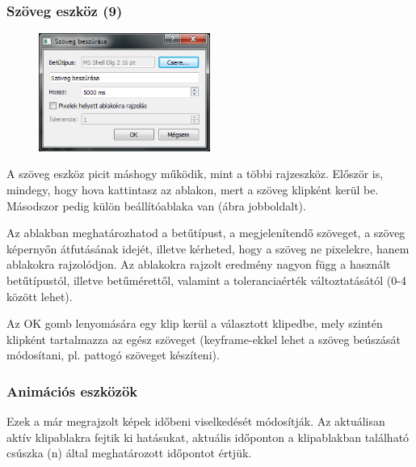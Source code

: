 \documentclass[a4paper,12pt,release]{article}
\begin{document}
\subsubsection{Szöveg eszköz (9)}
\begin{figure}
	\vspace{-27pt}
	\begin{center}
		\includegraphics[width=0.5\textwidth]{pics/inserttext.png}
	\end{center}
	\vspace{-20pt}
\end{figure}
A szöveg eszköz picit máshogy működik, mint a többi rajzeszköz. Először is, mindegy, hogy hova kattintasz az ablakon, mert a szöveg klipként kerül be. Másodszor pedig külön beállítóablaka van (ábra jobboldalt).

Az ablakban meghatározhatod a betűtípust, a megjelenítendő szöveget, a szöveg képernyőn átfutásának idejét, illetve kérheted, hogy a szöveg ne pixelekre, hanem ablakokra rajzolódjon. Az ablakokra rajzolt eredmény nagyon függ a használt betűtípustól, illetve betűmérettől, valamint a toleranciaérték változtatásától (0-4 között lehet).

Az OK gomb lenyomására egy klip kerül a választott klipedbe, mely szintén klipként tartalmazza az egész szöveget (keyframe-ekkel lehet a szöveg beúszását módosítani, pl. pattogó szöveget készíteni).

\subsubsection{Animációs eszközök}
Ezek a már megrajzolt képek időbeni viselkedését módosítják. Az aktuálisan aktív klipablakra fejtik ki hatásukat, aktuális időponton a klipablakban található csúszka (n) által meghatározott időpontot értjük.
\end{document}
